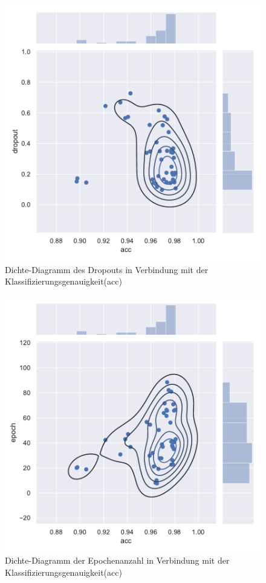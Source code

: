 \begin{figure}[H]
  \centering  
  \includegraphics[scale=0.5]{anhang/GA_250_mnist_digits_False_big_jointplot_dropout.pdf}
  \caption{Dichte-Diagramm des Dropouts in Verbindung mit der Klassifizierungsgenauigkeit(acc)}
  
\end{figure}

\begin{figure}[H]
  \centering  
  \includegraphics[scale=0.5]{anhang/GA_250_mnist_digits_False_big_jointplot_epoch.pdf}
  \caption{Dichte-Diagramm der Epochenanzahl in Verbindung mit der Klassifizierungsgenauigkeit(acc)}
  
\end{figure}

